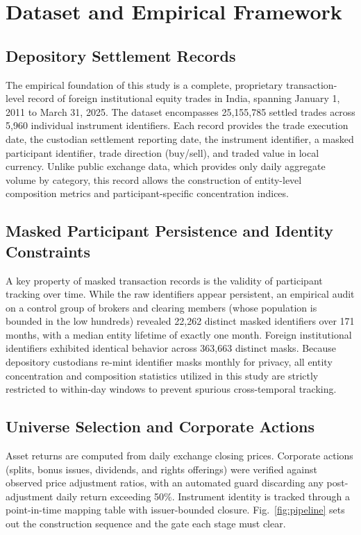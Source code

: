 \documentclass{ieeeaccess}
\begin{document}
\section{Dataset and Empirical Framework}
\label{sec:data}

\subsection{Depository Settlement Records}
The empirical foundation of this study is a complete, proprietary transaction-level record of foreign institutional equity trades in India, spanning January 1, 2011 to March 31, 2025. The dataset encompasses 25,155,785 settled trades across 5,960 individual instrument identifiers. Each record provides the trade execution date, the custodian settlement reporting date, the instrument identifier, a masked participant identifier, trade direction (buy/sell), and traded value in local currency. Unlike public exchange data, which provides only daily aggregate volume by category, this record allows the construction of entity-level composition metrics and participant-specific concentration indices.

\subsection{Masked Participant Persistence and Identity Constraints}
A key property of masked transaction records is the validity of participant tracking over time. While the raw identifiers appear persistent, an empirical audit on a control group of brokers and clearing members (whose population is bounded in the low hundreds) revealed 22,262 distinct masked identifiers over 171 months, with a median entity lifetime of exactly one month. Foreign institutional identifiers exhibited identical behavior across 363,663 distinct masks. Because depository custodians re-mint identifier masks monthly for privacy, all entity concentration and composition statistics utilized in this study are strictly restricted to within-day windows to prevent spurious cross-temporal tracking.

\subsection{Universe Selection and Corporate Actions}
Asset returns are computed from daily exchange closing prices. Corporate actions (splits, bonus issues, dividends, and rights offerings) were verified against observed price adjustment ratios, with an automated guard discarding any post-adjustment daily return exceeding 50\%. Instrument identity is tracked through a point-in-time mapping table with issuer-bounded closure. Fig.~\ref{fig:pipeline} sets out the construction sequence and the gate each stage must clear.
\end{document}
